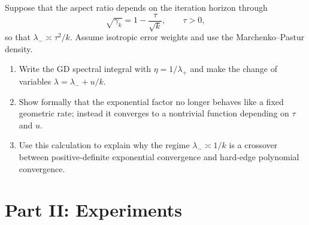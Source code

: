 \documentclass[11pt]{article}
\begin{document}
\begin{enumerate}[label=\textbf{T\arabic*.}, leftmargin=0pt, itemindent=2.5em]
Suppose that the aspect ratio depends on the iteration horizon through
\[
\sqrt{\gamma_k}=1-\frac{\tau}{\sqrt{k}},
\qquad \tau>0,
\]
so that $\lambda_-\asymp \tau^2/k$. Assume isotropic error weights and use the Marchenko--Pastur density.
\begin{enumerate}[label=(\alph*)]
\item Write the GD spectral integral with $\eta=1/\lambda_+$ and make the change of variables $\lambda=\lambda_-+u/k$.
\item Show formally that the exponential factor no longer behaves like a fixed geometric rate; instead it converges to a nontrivial function depending on $\tau$ and $u$.
\item Use this calculation to explain why the regime $\lambda_-\asymp 1/k$ is a crossover between positive-definite exponential convergence and hard-edge polynomial convergence.
\end{enumerate}

\end{enumerate}

\section*{Part II: Experiments}
\end{document}
